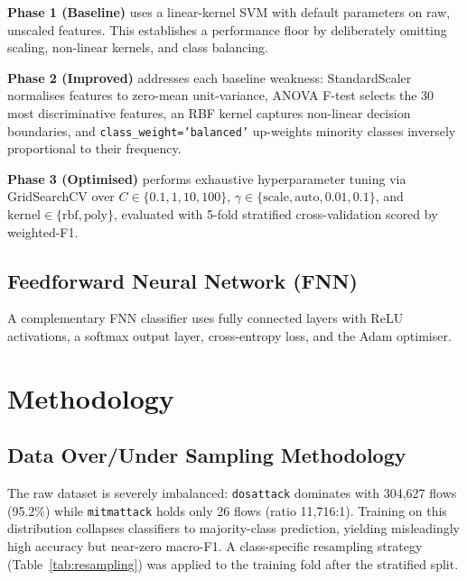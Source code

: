 \documentclass{article}
\begin{document}
\textbf{Phase 1 (Baseline)} uses a linear-kernel SVM with default parameters on raw, unscaled features. This establishes a performance floor by deliberately omitting scaling, non-linear kernels, and class balancing.

\textbf{Phase 2 (Improved)} addresses each baseline weakness: StandardScaler normalises features to zero-mean unit-variance, ANOVA F-test selects the 30 most discriminative features, an RBF kernel captures non-linear decision boundaries, and \texttt{class\_weight='balanced'} up-weights minority classes inversely proportional to their frequency.

\textbf{Phase 3 (Optimised)} performs exhaustive hyperparameter tuning via GridSearchCV over $C \in \{0.1, 1, 10, 100\}$, $\gamma \in \{\text{scale}, \text{auto}, 0.01, 0.1\}$, and $\text{kernel} \in \{\text{rbf}, \text{poly}\}$, evaluated with 5-fold stratified cross-validation scored by weighted-F1.

\subsection{Feedforward Neural Network (FNN)}

A complementary FNN classifier uses fully connected layers with ReLU activations, a softmax output layer, cross-entropy loss, and the Adam optimiser.

\section{Methodology}

\subsection{Data Over/Under Sampling Methodology}

The raw dataset is severely imbalanced: \texttt{dosattack} dominates with 304,627 flows (95.2\%) while \texttt{mitmattack} holds only 26 flows (ratio 11,716:1). Training on this distribution collapses classifiers to majority-class prediction, yielding misleadingly high accuracy but near-zero macro-F1. A class-specific resampling strategy (Table~\ref{tab:resampling}) was applied to the training fold after the stratified split.
\end{document}
